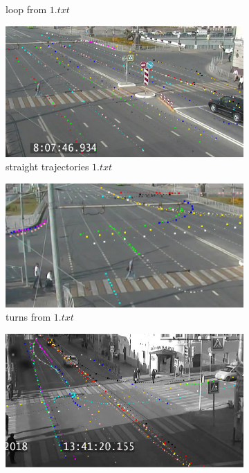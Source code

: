 \begin{figure}[!htb]
\begin{subfigure}[!htb]{0.25\textwidth}
		\caption{loop from $1.txt$}
	\end{subfigure}
	\hfill
	\begin{subfigure}[!htb]{0.48\textwidth}
		\centering{}
		\includegraphics[width=\textwidth]{images/rdp-n-straight-before.png}
		\caption{straight trajectories $1.txt$}
	\end{subfigure}
	\hfill
	\begin{subfigure}[!htb]{0.48\textwidth}
		\centering{}
		\includegraphics[width=\textwidth]{images/rdp-n-turns.png}
		\caption{turns from $1.txt$}
	\end{subfigure}
	\hfill
	\begin{subfigure}[!htb]{0.48\textwidth}
		\centering{}
		\includegraphics[width=\textwidth]{images/rdp-n-long-3.png}

\end{subfigure}
\end{figure}
